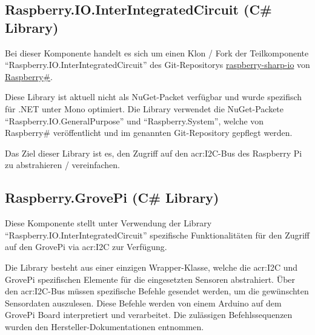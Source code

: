 \subsection{Raspberry.IO.InterIntegratedCircuit (C\# Library)}
Bei dieser Komponente handelt es sich um einen Klon / Fork der Teilkomponente "`Raspberry.IO.InterIntegratedCircuit"' des Git-Repositorys \hyperlink{https://github.com/raspberry-sharp/raspberry-sharp-io/tree/master/Raspberry.IO.InterIntegratedCircuit}{raspberry-sharp-io} von \hyperlink{https://github.com/raspberry-sharp}{Raspberry\#}.

Diese Library ist aktuell nicht als NuGet-Packet verfügbar und wurde spezifisch für .NET unter Mono optimiert. Die Library verwendet die NuGet-Packete "`Raspberry.IO.GeneralPurpose"' und "`Raspberry.System"', welche von Raspberry\# veröffentlicht und im genannten Git-Repository gepflegt werden.

Das Ziel dieser Library ist es, den Zugriff auf den \gls{acr:I2C}-Bus des Raspberry Pi zu abstrahieren / vereinfachen.

\subsection{Raspberry.GrovePi (C\# Library)}
Diese Komponente stellt unter Verwendung der Library "`Raspberry.IO.InterIntegratedCircuit"' spezifische Funktionalitäten für den Zugriff auf den GrovePi via \gls{acr:I2C} zur Verfügung.

Die Library besteht aus einer einzigen Wrapper-Klasse, welche die \gls{acr:I2C} und GrovePi spezifischen Elemente für die eingesetzten Sensoren abstrahiert. Über den \gls{acr:I2C}-Bus müssen spezifische Befehle gesendet werden, um die gewünschten Sensordaten auszulesen. Diese Befehle werden von einem Arduino auf dem GrovePi Board interpretiert und verarbeitet. Die zulässigen Befehlssequenzen wurden den Hersteller-Dokumentationen entnommen.


